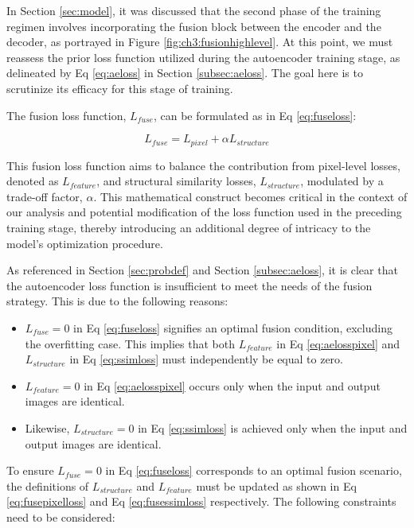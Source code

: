 In Section \ref{sec:model}, it was discussed that the second phase of the training regimen involves incorporating the fusion block between the encoder and the decoder, as portrayed in Figure \ref{fig:ch3:fusionhighlevel}. At this point, we must reassess the prior loss function utilized during the autoencoder training stage, as delineated by Eq \ref{eq:aeloss} in Section \ref{subsec:aeloss}. The goal here is to scrutinize its efficacy for this stage of training.

The fusion loss function, $L_{fuse}$, can be formulated as in Eq \ref{eq:fuseloss}:

\begin{equation}\label{eq:fuseloss}
    L_{fuse} = L_{pixel} + \alpha  L_{structure}
\end{equation}

This fusion loss function aims to balance the contribution from pixel-level losses, denoted as $L_{feature}$, and structural similarity losses, $L_{structure}$, modulated by a trade-off factor, $\alpha$. This mathematical construct becomes critical in the context of our analysis and potential modification of the loss function used in the preceding training stage, thereby introducing an additional degree of intricacy to the model's optimization procedure.

As referenced in Section \ref{sec:probdef} and Section \ref{subsec:aeloss}, it is clear that the autoencoder loss function is insufficient to meet the needs of the fusion strategy. This is due to the following reasons:

\begin{itemize}
    \item $L_{fuse} = 0$ in Eq \ref{eq:fuseloss} signifies an optimal fusion condition, excluding the overfitting case. This implies that both $L_{feature}$ in Eq \ref{eq:aelosspixel} and $L_{structure}$ in Eq \ref{eq:ssimloss} must independently be equal to zero.
    \item $L_{feature} = 0$ in Eq \ref{eq:aelosspixel} occurs only when the input and output images are identical.
    \item Likewise, $L_{structure} = 0$ in Eq \ref{eq:ssimloss} is achieved only when the input and output images are identical.
\end{itemize}

To ensure $L_{fuse} = 0 $ in Eq \ref{eq:fuseloss} corresponds to an optimal fusion scenario, the definitions of $L_{structure}$ and $L_{feature}$ must be updated as shown in Eq \ref{eq:fusepixelloss} and Eq \ref{eq:fusessimloss} respectively. The following constraints need to be considered:

